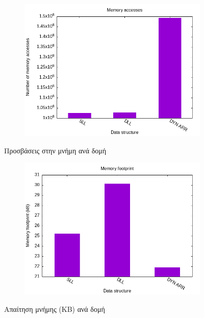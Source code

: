 \documentclass{article}
\begin{document}
\begin{figure}[h]
    \begin{subfigure}{0.4\textwidth}
        
    \end{subfigure}
    \begin{subfigure}{0.6\textwidth}
        \includegraphics[width=\textwidth]{../src/dijsktra/mem_access.png}
    \end{subfigure}
    \caption{Προσβάσεις στην μνήμη ανά δομή}
    \begin{subfigure}{0.4\textwidth}
        
    \end{subfigure}
    \begin{subfigure}{0.6\textwidth}
        \includegraphics[width=\textwidth]{../src/dijsktra/mem_footprint.png}
    \end{subfigure}
    \caption{Απαίτηση μνήμης (ΚΒ) ανά δομή}
\end{figure}
\FloatBarrier
\end{document}

